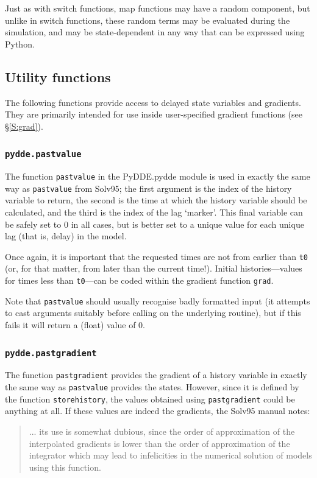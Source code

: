 \documentclass[10pt,a4paper] {article}
\begin{document}
Just as with switch functions, map functions may have a random component, but unlike in switch functions, these random terms may be evaluated during the simulation, and may be state-dependent in any way that can be expressed using Python.

\subsection{Utility functions}

The following functions provide access to delayed state variables and gradients.  They are primarily intended for use inside user-specified gradient functions (see \S\ref{S:grad}).

\subsubsection{\tt pydde.pastvalue}

The function \verb+pastvalue+ in the PyDDE.pydde module is used in exactly the same way as \verb+pastvalue+ from Solv95; the first argument is the index of the history variable to return, the second is the time at which the history variable should be calculated, and the third is the index of the lag `marker'.  This final variable can be safely set to $0$ in all cases, but is better set to a unique value for each unique lag (that is, delay) in the model.

Once again, it is important that the requested times are not from earlier than \verb+t0+ (or, for that matter, from later than the current time!).  Initial histories---values for times less than \verb+t0+---can be coded within the gradient function \verb+grad+.

Note that \verb+pastvalue+ should usually recognise badly formatted input (it attempts to cast arguments suitably before calling on the underlying routine), but if this fails it will return a (float) value of 0.

\subsubsection{\tt pydde.pastgradient}

The function \verb+pastgradient+ provides the gradient of a history variable in exactly the same way as \verb+pastvalue+ provides the states.  However, since it is defined by the function \verb+storehistory+, the values obtained using \verb+pastgradient+ could be anything at all.  If these values are indeed the gradients, the Solv95 manual notes:
\begin{quotation}
... its use is somewhat dubious, since the order of approximation of the interpolated gradients is lower than the order of approximation of the integrator which may lead to infelicities in the numerical solution of models using this function.
\end{quotation}
\end{document}
